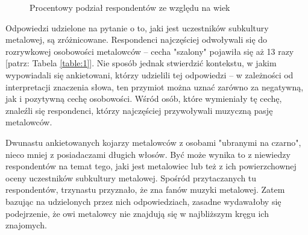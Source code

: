 \documentclass[12pt, a4paper, titlepage]{report}
\begin{document}
\begin{figure}[!htb]
     \centering
     \mydata

     \caption{Procentowy podział respondentów ze względu na wiek}
     \label{Wykr}
    \end{figure}

Odpowiedzi udzielone na pytanie o to, jaki jest uczestników subkultury metalowej, są zróżnicowane. Respondenci najczęściej odwoływali się do rozrywkowej osobowości metalowców -- cecha "szalony" pojawiła się aż 13 razy [patrz: Tabela \ref{table:1}]. Nie sposób jednak stwierdzić kontekstu, w jakim wypowiadali się ankietowani, którzy udzielili tej odpowiedzi -- w zależności od interpretacji znaczenia słowa, ten przymiot można uznać zarówno za negatywną, jak i pozytywną cechę osobowości. Wśród osób, które wymieniały tę cechę, znaleźli się respondenci, którzy najczęściej przywoływali muzyczną pasję metalowców. 

Dwunastu ankietowanych kojarzy metalowców z osobami "ubranymi na czarno", nieco mniej z posiadaczami długich włosów. Być może wynika to z niewiedzy respondentów na temat tego, jaki jest metalowiec lub też z ich powierzchownej oceny uczestników subkultury metalowej.  Spośród przytaczanych tu respondentów, trzynastu przyznało, że zna fanów muzyki metalowej. Zatem bazując na udzielonych przez nich odpowiedziach, zasadne wydawałoby się podejrzenie, że owi metalowcy nie znajdują się w najbliższym kręgu ich znajomych. 
\end{document}
